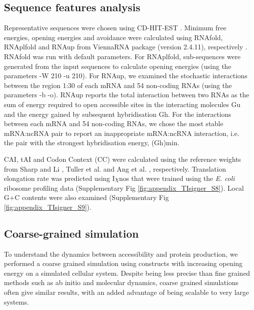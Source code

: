 \subsection{Sequence features analysis}
Representative sequences were chosen using CD-HIT-EST \cite{Li2006-qp,Fu2012-ng}. Minimum free energies, opening energies and avoidance were calculated using RNAfold, RNAplfold and RNAup from ViennaRNA package (version 2.4.11), respectively \cite{Hofacker1994-vu,Muckstein2006-ys,Bernhart_undated-tw,Bompfunewerer2008-tm,Lorenz2011-rg,Bernhart2011-cc,Lorenz2016-ie}. RNAfold was run with default parameters. For RNAplfold, sub-sequences were generated from the input sequences to calculate opening energies (using the parameters -W 210 -u 210). For RNAup, we examined the stochastic interactions between the region 1:30 of each mRNA and 54 non-coding RNAs (using the parameters -b -o). RNAup reports the total interaction between two RNAs as the sum of energy required to open accessible sites in the interacting molecules Gu and the energy gained by subsequent hybridisation Gh\cite{Muckstein2006-ys}. For the interactions between each mRNA and 54 non-coding RNAs, we chose the most stable mRNA:ncRNA pair to report an inappropriate mRNA:ncRNA interaction, i.e. the pair with the strongest hybridisation energy, (Gh)min. 

CAI, tAI and Codon Context (CC) were calculated using the reference weights from Sharp and Li \cite{Sharp1987-ed}, Tuller et al. \cite{Tuller2010-ub} and Ang et al. \cite{Ang2016-rv}, respectively. Translation elongation rate was predicted using I$\chi$nos \cite{Tunney2018-sr} that were trained using the \textit{E. coli} ribosome profiling data (Supplementary Fig \ref{fig:appendix_TIsigner_S8}). Local G+C contents were also examined (Supplementary Fig \ref{fig:appendix_TIsigner_S9}).

\subsection{Coarse-grained simulation}
To understand the dynamics between accessibility and protein production, we performed a coarse grained simulation using constructs with increasing opening energy on a simulated cellular system. Despite being less precise than fine grained methods such as ab initio and molecular dynamics, coarse grained simulations often give similar results, with an added advantage of being scalable to very large systems.

